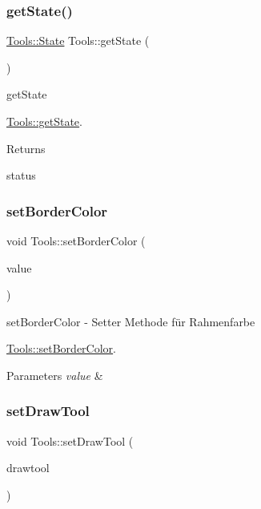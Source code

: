 \subsubsection{\texorpdfstring{get\+State()}{getState()}}
{\footnotesize\ttfamily \hyperlink{class_tools_a2847c269682818722541d9002fdf0824}{Tools\+::\+State} Tools\+::get\+State (\begin{DoxyParamCaption}{ }\end{DoxyParamCaption})}



get\+State 

\hyperlink{class_tools_ae81ec47ff47279c8a8f319d822c3bb9f}{Tools\+::get\+State}.

\begin{DoxyReturn}{Returns}


status 
\end{DoxyReturn}
\mbox{\label{class_tools_a94304e05407643ce69f20ba93538d3d5}} 
\subsubsection{\texorpdfstring{set\+Border\+Color}{setBorderColor}}
{\footnotesize\ttfamily void Tools\+::set\+Border\+Color (\begin{DoxyParamCaption}\item[{const Q\+Color \&}]{value }\end{DoxyParamCaption})\hspace{0.3cm}{\ttfamily [slot]}}



set\+Border\+Color -\/ Setter Methode für Rahmenfarbe 

\hyperlink{class_tools_a94304e05407643ce69f20ba93538d3d5}{Tools\+::set\+Border\+Color}.


\begin{DoxyParams}{Parameters}
{\em value} & \\
\hline
\end{DoxyParams}
\mbox{\label{class_tools_aa53c7186fb6cd6104ff42014b6f44f93}} 
\subsubsection{\texorpdfstring{set\+Draw\+Tool}{setDrawTool}}
{\footnotesize\ttfamily void Tools\+::set\+Draw\+Tool (\begin{DoxyParamCaption}\item[{const \hyperlink{class_tools_ab031688a77e89a80ce8b5db7014684a3}{Tools\+::\+Draw\+Tool}}]{drawtool }\end{DoxyParamCaption})\hspace{0.3cm}{\ttfamily [slot]}}



